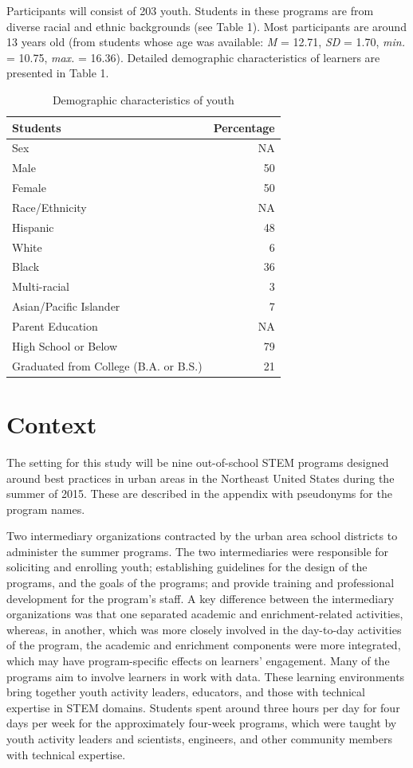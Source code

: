 \documentclass[]{book}
\theoremstyle{definition}
\theoremstyle{definition}
\theoremstyle{definition}
\theoremstyle{remark}
\begin{document}
Participants will consist of 203 youth. Students in these programs are
from diverse racial and ethnic backgrounds (see Table 1). Most
participants are around 13 years old (from students whose age was
available: \emph{M} = 12.71, \emph{SD} = 1.70, \emph{min.} = 10.75,
\emph{max.} = 16.36). Detailed demographic characteristics of learners
are presented in Table 1.

\begin{table}

\caption{\label{tab:unnamed-chunk-3}Demographic characteristics of youth}
\centering
\begin{tabular}[t]{lr}
\toprule
Students & Percentage\\
\midrule
Sex & NA\\
Male & 50\\
Female & 50\\
Race/Ethnicity & NA\\
Hispanic & 48\\
\addlinespace
White & 6\\
Black & 36\\
Multi-racial & 3\\
Asian/Pacific Islander & 7\\
Parent Education & NA\\
\addlinespace
High School or Below & 79\\
Graduated from College (B.A. or B.S.) & 21\\
\bottomrule
\end{tabular}
\end{table}

\section{Context}\label{context}

The setting for this study will be nine out-of-school STEM programs
designed around best practices in urban areas in the Northeast United
States during the summer of 2015. These are described in the appendix
with pseudonyms for the program names.

Two intermediary organizations contracted by the urban area school
districts to administer the summer programs. The two intermediaries were
responsible for soliciting and enrolling youth; establishing guidelines
for the design of the programs, and the goals of the programs; and
provide training and professional development for the program's staff. A
key difference between the intermediary organizations was that one
separated academic and enrichment-related activities, whereas, in
another, which was more closely involved in the day-to-day activities of
the program, the academic and enrichment components were more
integrated, which may have program-specific effects on learners'
engagement. Many of the programs aim to involve learners in work with
data. These learning environments bring together youth activity leaders,
educators, and those with technical expertise in STEM domains. Students
spent around three hours per day for four days per week for the
approximately four-week programs, which were taught by youth activity
leaders and scientists, engineers, and other community members with
technical expertise.
\end{document}
